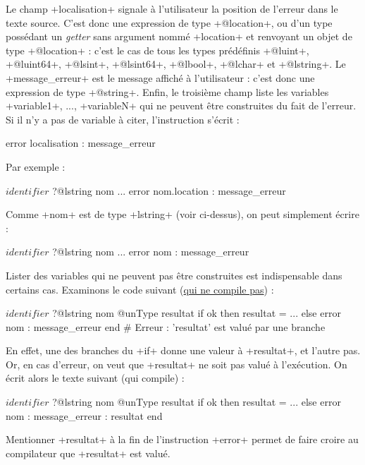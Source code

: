 Le champ \ggs+localisation+ signale à l'utilisateur la position de l'erreur dans le texte source. C'est donc une expression de type \ggs+@location+, ou d'un type possédant un \emph{getter} sans argument nommé \ggs+location+ et renvoyant un objet de type \ggs+@location+ : c'est le cas de tous les types prédéfinis \ggs+@luint+, \ggs+@luint64+, \ggs+@lsint+, \ggs+@lsint64+, \ggs+@lbool+, \ggs+@lchar+ et \ggs+@lstring+. Le \ggs+message_erreur+ est le message affiché à l'utilisateur : c'est donc une expression de type \ggs+@string+. Enfin, le troisième champ liste les variables \ggs+variable1+, ..., \ggs+variableN+ qui ne peuvent être construites du fait de l'erreur. Si il n'y a pas de variable à citer, l'instruction s'écrit :
\begin{galgas}
error localisation : message_erreur
\end{galgas}

Par exemple :

\begin{galgas}
$identifier$ ?@lstring nom
...
error nom.location : message_erreur
\end{galgas}

Comme \ggs+nom+ est de type \ggs+lstring+ (voir ci-dessus), on peut simplement écrire :
\begin{galgas}
$identifier$ ?@lstring nom
...
error nom : message_erreur
\end{galgas}


Lister des variables qui ne peuvent pas être construites est indispensable dans certains cas. Examinons le code suivant (\underline{qui ne compile pas}) :
\begin{galgas}
$identifier$ ?@lstring nom
@unType resultat
if ok then
  resultat = ...
else
  error nom : message_erreur
end # Erreur : 'resultat' est valué par une branche
\end{galgas}

En effet, une des branches du \ggs+if+ donne une valeur à \ggs+resultat+, et l'autre pas. Or, en cas d'erreur, on veut que \ggs+resultat+ ne soit pas valué à l'exécution. On écrit alors le texte suivant (qui compile) :
\begin{galgas}
$identifier$ ?@lstring nom
@unType resultat
if ok then
  resultat = ...
else
  error nom : message_erreur : resultat
end
\end{galgas}

Mentionner \ggs+resultat+ à la fin de l'instruction \ggs+error+ permet de faire croire au compilateur que \ggs+resultat+ est valué.



